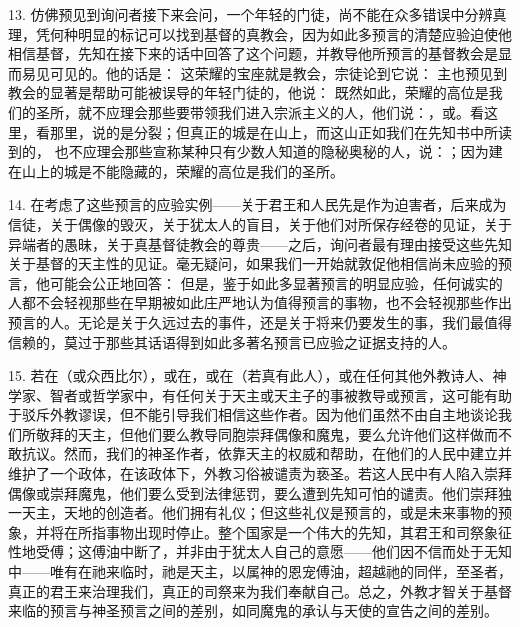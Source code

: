 13. 仿佛预见到询问者接下来会问，一个年轻的门徒，尚不能在众多错误中分辨真理，凭何种明显的标记可以找到基督的真教会，因为如此多预言的清楚应验迫使他相信基督，先知在接下来的话中回答了这个问题，并教导他所预言的基督教会是显而易见可见的。他的话是： 这荣耀的宝座就是教会，宗徒论到它说： 主也预见到教会的显著是帮助可能被误导的年轻门徒的，他说： 既然如此，荣耀的高位是我们的圣所，就不应理会那些要带领我们进入宗派主义的人，他们说：，或。看这里，看那里，说的是分裂；但真正的城是在山上，而这山正如我们在先知书中所读到的， 也不应理会那些宣称某种只有少数人知道的隐秘奥秘的人，说：；因为建在山上的城是不能隐藏的，荣耀的高位是我们的圣所。\par

14. 在考虑了这些预言的应验实例——关于君王和人民先是作为迫害者，后来成为信徒，关于偶像的毁灭，关于犹太人的盲目，关于他们对所保存经卷的见证，关于异端者的愚昧，关于真基督徒教会的尊贵——之后，询问者最有理由接受这些先知关于基督的天主性的见证。毫无疑问，如果我们一开始就敦促他相信尚未应验的预言，他可能会公正地回答： 但是，鉴于如此多显著预言的明显应验，任何诚实的人都不会轻视那些在早期被如此庄严地认为值得预言的事物，也不会轻视那些作出预言的人。无论是关于久远过去的事件，还是关于将来仍要发生的事，我们最值得信赖的，莫过于那些其话语得到如此多著名预言已应验之证据支持的人。\par

15. 若在（或众西比尔），或在，或在（若真有此人），或在任何其他外教诗人、神学家、智者或哲学家中，有任何关于天主或天主子的事被教导或预言，这可能有助于驳斥外教谬误，但不能引导我们相信这些作者。因为他们虽然不由自主地谈论我们所敬拜的天主，但他们要么教导同胞崇拜偶像和魔鬼，要么允许他们这样做而不敢抗议。然而，我们的神圣作者，依靠天主的权威和帮助，在他们的人民中建立并维护了一个政体，在该政体下，外教习俗被谴责为亵圣。若这人民中有人陷入崇拜偶像或崇拜魔鬼，他们要么受到法律惩罚，要么遭到先知可怕的谴责。他们崇拜独一天主，天地的创造者。他们拥有礼仪；但这些礼仪是预言的，或是未来事物的预象，并将在所指事物出现时停止。整个国家是一个伟大的先知，其君王和司祭象征性地受傅；这傅油中断了，并非由于犹太人自己的意愿——他们因不信而处于无知中——唯有在祂来临时，祂是天主，以属神的恩宠傅油，超越祂的同伴，至圣者，真正的君王来治理我们，真正的司祭来为我们奉献自己。总之，外教才智关于基督来临的预言与神圣预言之间的差别，如同魔鬼的承认与天使的宣告之间的差别。\par


